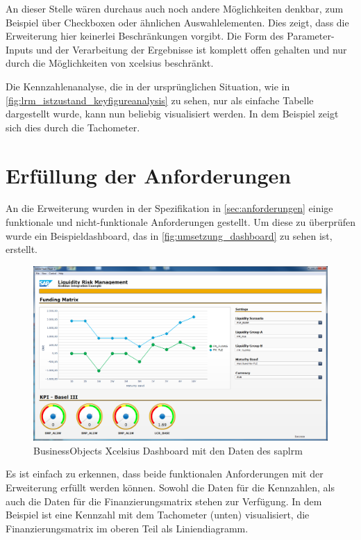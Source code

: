 \begin{onehalfspacing}
An dieser Stelle wären durchaus auch noch andere Möglichkeiten denkbar, zum Beispiel über Checkboxen oder ähnlichen Auswahlelementen. Dies zeigt, dass die Erweiterung hier keinerlei Beschränkungen vorgibt. Die Form des Parameter-Inputs und der Verarbeitung der Ergebnisse ist komplett offen gehalten und nur durch die Möglichkeiten von \gls{xcelsius} beschränkt.

Die Kennzahlenanalyse, die in der ursprünglichen Situation, wie in \vref{fig:lrm_istzustand_keyfigureanalysis} zu sehen, nur als einfache Tabelle dargestellt wurde, kann nun beliebig visualisiert werden. In dem Beispiel zeigt sich dies durch die Tachometer.


\section{Erfüllung der Anforderungen}
An die Erweiterung wurden in der Spezifikation in \vref{sec:anforderungen} einige funktionale und nicht-funktionale Anforderungen gestellt. Um diese zu überprüfen wurde ein Beispieldashboard, das in \vref{fig:umsetzung_dashboard} zu sehen ist, erstellt.

\begin{figure}[ht]
\centering
\setlength{\unitlength}{1mm}
\includegraphics[width=15cm]{images/dashboard_preview.PNG}
\caption{BusinessObjects Xcelsius Dashboard mit den Daten des \gls{saplrm}\label{fig:umsetzung_dashboard}}
\end{figure} 

Es ist einfach zu erkennen, dass beide funktionalen Anforderungen mit der Erweiterung erfüllt werden können. Sowohl die Daten für die Kennzahlen, als auch die Daten für die Finanzierungsmatrix stehen zur Verfügung. In dem Beispiel ist eine Kennzahl mit dem Tachometer (unten) visualisiert, die Finanzierungsmatrix im oberen Teil als Liniendiagramm.


\end{onehalfspacing}
